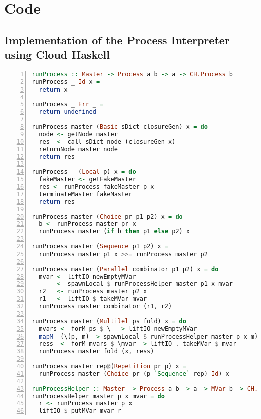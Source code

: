 \chapter{Code}

\clearpage

\section{Implementation of the Process Interpreter using Cloud Haskell}
\label{app:distributed_split_slice}
\begin{lstlisting}[language=Haskell,frame=tb,numbers=left,caption=Implementation of \texttt{runProcess} using \textsf{Cloud Haskell}.]
runProcess :: Master -> Process a b -> a -> CH.Process b
runProcess _ Id x =
  return x

runProcess _ Err _ =
  return undefined

runProcess master (Basic sDict closureGen) x = do
  node <- getNode master
  res  <- call sDict node (closureGen x)
  returnNode master node
  return res

runProcess _ (Local p) x = do
  fakeMaster <- getFakeMaster
  res <- runProcess fakeMaster p x
  terminateMaster fakeMaster
  return res

runProcess master (Choice pr p1 p2) x = do
  b <- runProcess master pr x
  runProcess master (if b then p1 else p2) x

runProcess master (Sequence p1 p2) x =
  runProcess master p1 x >>= runProcess master p2

runProcess master (Parallel combinator p1 p2) x = do
  mvar <- liftIO newEmptyMVar
  _    <- spawnLocal $ runProcessHelper master p1 x mvar
  r2   <- runProcess master p2 x
  r1   <- liftIO $ takeMVar mvar
  runProcess master combinator (r1, r2)

runProcess master (Multilel ps fold) x = do
  mvars <- forM ps $ \_ -> liftIO newEmptyMVar
  mapM_ (\(p, m) -> spawnLocal $ runProcessHelper master p x m)   (ps `zip` mvars)
  ress  <- forM mvars $ \mvar -> liftIO . takeMVar $ mvar
  runProcess master fold (x, ress)

runProcess master rep@(Repetition pr p) x =
  runProcess master (Choice pr (p `Sequence` rep) Id) x

runProcessHelper :: Master -> Process a b -> a -> MVar b -> CH.Process ()
runProcessHelper master p x mvar = do
  r <- runProcess master p x
  liftIO $ putMVar mvar r
\end{lstlisting}

